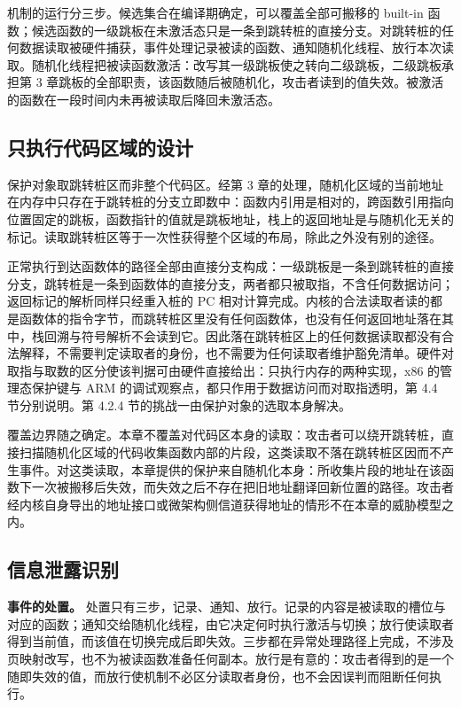 机制的运行分三步。候选集合在编译期确定，可以覆盖全部可搬移的 built-in 函数；候选函数的一级跳板在未激活态只是一条到跳转桩的直接分支。对跳转桩的任何数据读取被硬件捕获，事件处理记录被读的函数、通知随机化线程、放行本次读取。随机化线程把被读函数激活：改写其一级跳板使之转向二级跳板，二级跳板承担第 3 章跳板的全部职责，该函数随后被随机化，攻击者读到的值失效。被激活的函数在一段时间内未再被读取后降回未激活态。

\subsection{只执行代码区域的设计}

保护对象取跳转桩区而非整个代码区。经第 3 章的处理，随机化区域的当前地址在内存中只存在于跳转桩的分支立即数中：函数内引用是相对的，跨函数引用指向位置固定的跳板，函数指针的值就是跳板地址，栈上的返回地址是与随机化无关的标记。读取跳转桩区等于一次性获得整个区域的布局，除此之外没有别的途径。

正常执行到达函数体的路径全部由直接分支构成：一级跳板是一条到跳转桩的直接分支，跳转桩是一条到函数体的直接分支，两者都只被取指，不含任何数据访问；返回标记的解析同样只经重入桩的 PC 相对计算完成。内核的合法读取者读的都是函数体的指令字节，而跳转桩区里没有任何函数体，也没有任何返回地址落在其中，栈回溯与符号解析不会读到它。因此落在跳转桩区上的任何数据读取都没有合法解释，不需要判定读取者的身份，也不需要为任何读取者维护豁免清单。硬件对取指与取数的区分使该判据可由硬件直接给出：只执行内存的两种实现，x86 的管理态保护键与 ARM 的调试观察点，都只作用于数据访问而对取指透明，第 4.4 节分别说明。第 4.2.4 节的挑战一由保护对象的选取本身解决。

覆盖边界随之确定。本章不覆盖对代码区本身的读取：攻击者可以绕开跳转桩，直接扫描随机化区域的代码收集函数内部的片段，这类读取不落在跳转桩区因而不产生事件。对这类读取，本章提供的保护来自随机化本身：所收集片段的地址在该函数下一次被搬移后失效，而失效之后不存在把旧地址翻译回新位置的路径。攻击者经内核自身导出的地址接口或微架构侧信道获得地址的情形不在本章的威胁模型之内。

\subsection{信息泄露识别}

\textbf{事件的处置。} 处置只有三步，记录、通知、放行。记录的内容是被读取的槽位与对应的函数；通知交给随机化线程，由它决定何时执行激活与切换；放行使读取者得到当前值，而该值在切换完成后即失效。三步都在异常处理路径上完成，不涉及页映射改写，也不为被读函数准备任何副本。放行是有意的：攻击者得到的是一个随即失效的值，而放行使机制不必区分读取者身份，也不会因误判而阻断任何执行。

